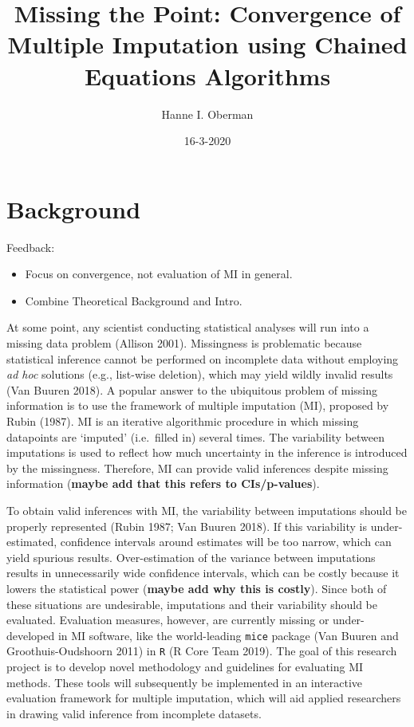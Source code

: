 \documentclass[
  Royal, times, sageapa]{sagej}
\title{Missing the Point: Convergence of Multiple Imputation using Chained
Equations Algorithms}
\author{Hanne I. Oberman}
\date{16-3-2020}
\begin{document}
\maketitle

\hypertarget{background}{%
\section{Background}\label{background}}

Feedback:

\begin{itemize}
\item
  Focus on convergence, not evaluation of MI in general.
\item
  Combine Theoretical Background and Intro.
\end{itemize}

At some point, any scientist conducting statistical analyses will run
into a missing data problem (Allison 2001). Missingness is problematic
because statistical inference cannot be performed on incomplete data
without employing \emph{ad hoc} solutions (e.g., list-wise deletion),
which may yield wildly invalid results (Van Buuren 2018). A popular
answer to the ubiquitous problem of missing information is to use the
framework of multiple imputation (MI), proposed by Rubin (1987). MI is
an iterative algorithmic procedure in which missing datapoints are
`imputed' (i.e.~filled in) several times. The variability between
imputations is used to reflect how much uncertainty in the inference is
introduced by the missingness. Therefore, MI can provide valid
inferences despite missing information (\textbf{maybe add that this
refers to CIs/p-values}).

To obtain valid inferences with MI, the variability between imputations
should be properly represented (Rubin 1987; Van Buuren 2018). If this
variability is under-estimated, confidence intervals around estimates
will be too narrow, which can yield spurious results. Over-estimation of
the variance between imputations results in unnecessarily wide
confidence intervals, which can be costly because it lowers the
statistical power (\textbf{maybe add why this is costly}). Since both of
these situations are undesirable, imputations and their variability
should be evaluated. Evaluation measures, however, are currently missing
or under-developed in MI software, like the world-leading \texttt{mice}
package (Van Buuren and Groothuis-Oudshoorn 2011) in \texttt{R} (R Core
Team 2019). The goal of this research project is to develop novel
methodology and guidelines for evaluating MI methods. These tools will
subsequently be implemented in an interactive evaluation framework for
multiple imputation, which will aid applied researchers in drawing valid
inference from incomplete datasets.
\end{document}
